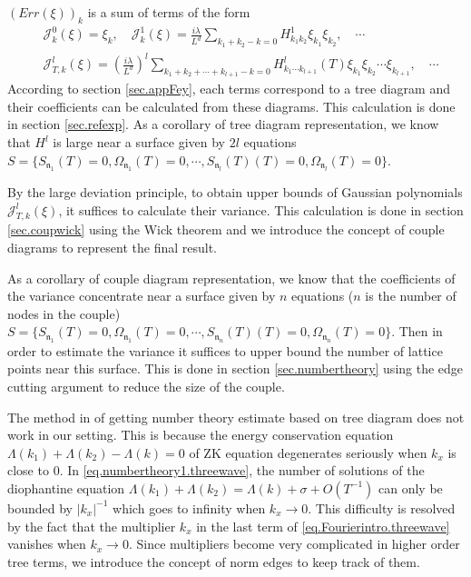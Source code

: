 $(Err(\xi))_{k}$ is a sum of terms of the form
\begin{equation}
\begin{split}
    &\mathcal{J}_{k}^0(\xi)=  \xi_k, \quad \mathcal{J}_k^1(\xi)=\frac{i\lambda}{L^{d}} \sum_{k_1+k_2-k=0} H^1_{k_1k_2}  \xi_{k_1}\xi_{k_2} , \quad\cdots  \\
    &\mathcal{J}_{T,k}^l(\xi)=\left(\frac{i\lambda}{L^{d}}\right)^l\sum_{k_1+k_2+\cdots+k_{l+1}-k=0} H^l_{k_1\cdots k_{l+1}}(T)  \xi_{k_1}\xi_{k_2}\cdots\xi_{k_{l+1}}, \quad\cdots 
\end{split}
\end{equation}
According to section \ref{sec.appFey}, each terms correspond to a tree diagram and their coefficients can be calculated from these diagrams. This calculation is done in section \ref{sec.refexp}. As a corollary of tree diagram representation, we know that $H^l$ is large near a surface given by $2l$ equations $S=\{S_{\mathfrak{n}_1}(T)=0,\Omega_{\mathfrak{n}_1}(T)=0,\cdots,S_{\mathfrak{n}_{l}}(T)(T)=0,\Omega_{\mathfrak{n}_l}(T)=0\}$.

By the large deviation principle, to obtain upper bounds of Gaussian polynomials $\mathcal{J}_{T,k}^l(\xi)$, it suffices to calculate their variance. This calculation is done in section \ref{sec.coupwick} using the Wick theorem and we introduce the concept of couple diagrams to represent the final result. 

As a corollary of couple diagram representation, we know that the coefficients of the variance concentrate near a surface given by $n$ equations ($n$ is the number of nodes in the couple) $S=\{S_{\mathfrak{n}_1}(T)=0,\Omega_{\mathfrak{n}_1}(T)=0,\cdots,S_{\mathfrak{n}_{n}}(T)(T)=0,\Omega_{\mathfrak{n}_n}(T)=0\}$. Then in order to estimate the variance it suffices to upper bound the number of lattice points near this surface. This is done in section \ref{sec.numbertheory} using the edge cutting argument to reduce the size of the couple. 

The method in \cite{deng2021derivation} of getting number theory estimate based on tree diagram does not work in our setting. This is because the energy conservation equation $\Lambda(k_1)+\Lambda(k_2)-\Lambda(k)=0$ of ZK equation degenerates seriously when $k_{x}$ is close to $0$. In \eqref{eq.numbertheory1.threewave}, the number of solutions of the diophantine equation $\Lambda(k_1)+\Lambda(k_2)=\Lambda(k)+\sigma+O(T^{-1})$ can only be bounded by $|k_x|^{-1}$ which goes to infinity when $k_{x}\rightarrow 0$. This difficulty is resolved by the fact that the multiplier $k_x$ in the last term of \eqref{eq.Fourierintro.threewave} vanishes when $k_{x}\rightarrow 0$. Since multipliers become very complicated in higher order tree terms, we introduce the concept of norm edges to keep track of them. 

